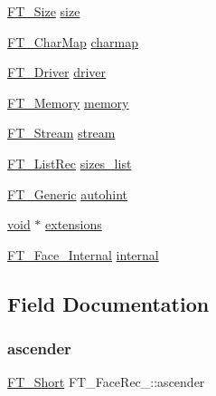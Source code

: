 \begin{DoxyCompactItemize}
\item 
\hyperlink{freetype_8h_a791d0ff3273ca9628a523efd98d138c1}{F\+T\+\_\+\+Size} \hyperlink{struct_f_t___face_rec___a212d116864a5d81e80b176f9b846cd08}{size}
\item 
\hyperlink{freetype_8h_afc4717ddfd456a38ee15ec9c88fc7dac}{F\+T\+\_\+\+Char\+Map} \hyperlink{struct_f_t___face_rec___aca87d50488a5a1489741e8c13414c268}{charmap}
\item 
\hyperlink{freetype_8h_a5503c06c138ccdfeef486f2ce87bb8ec}{F\+T\+\_\+\+Driver} \hyperlink{struct_f_t___face_rec___a011b62fcffdd6dc421c9ab3286d4c9fa}{driver}
\item 
\hyperlink{ftsystem_8h_a67ec7ea35cde99a89a65e9f827a9ad3a}{F\+T\+\_\+\+Memory} \hyperlink{struct_f_t___face_rec___af269b241bfc2f570d485ab03fc0261b2}{memory}
\item 
\hyperlink{ftsystem_8h_a788b32c932932f7411a8dfa7f6c794bf}{F\+T\+\_\+\+Stream} \hyperlink{struct_f_t___face_rec___a831d5da25cd0fe2a783d2a73f467de55}{stream}
\item 
\hyperlink{fttypes_8h_ac01ed10278dab3cb3f046dba687b50ed}{F\+T\+\_\+\+List\+Rec} \hyperlink{struct_f_t___face_rec___a47504203e02bfba59c802c35cb4009ed}{sizes\+\_\+list}
\item 
\hyperlink{fttypes_8h_ae15e8550dd7d863328686aadaead5c77}{F\+T\+\_\+\+Generic} \hyperlink{struct_f_t___face_rec___a34ba9b1367f1b2d13676043b8da3ea73}{autohint}
\item 
\hyperlink{png_8h_ac9c84fa68bbad002983e35ce3663c686}{void} $\ast$ \hyperlink{struct_f_t___face_rec___a8b24f993e38da597d3e0273267890f49}{extensions}
\item 
\hyperlink{freetype_8h_a1b0af221e2e374269fa3dc687a1e4023}{F\+T\+\_\+\+Face\+\_\+\+Internal} \hyperlink{struct_f_t___face_rec___aed9a1267cddcbe790f0591471c886537}{internal}
\end{DoxyCompactItemize}


\subsection{Field Documentation}
\mbox{\label{struct_f_t___face_rec___afd0fe7d9dc08a4afbdec0ea0eabb0198}} 
\subsubsection{\texorpdfstring{ascender}{ascender}}
{\footnotesize\ttfamily \hyperlink{fttypes_8h_aa7279be89046a2563cd3d4d6651fbdcf}{F\+T\+\_\+\+Short} F\+T\+\_\+\+Face\+Rec\+\_\+\+::ascender}

